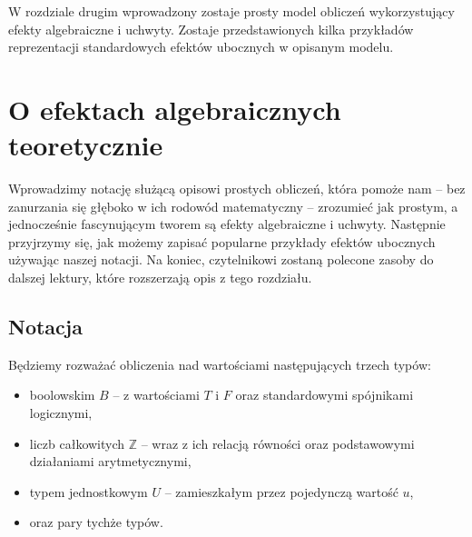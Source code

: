 \documentclass[shortabstract]{iithesis}
\begin{document}
W rozdziale drugim wprowadzony zostaje prosty model obliczeń wykorzystujący efekty algebraiczne i uchwyty. Zostaje przedstawionych kilka przykładów reprezentacji standardowych efektów ubocznych w opisanym modelu.



\chapter{O efektach algebraicznych teoretycznie}

Wprowadzimy notację służącą opisowi prostych obliczeń, która pomoże nam -- bez zanurzania się głęboko w ich rodowód matematyczny -- zrozumieć jak prostym, a jednocześnie fascynującym tworem są efekty algebraiczne i uchwyty. Następnie przyjrzymy się, jak możemy zapisać popularne przykłady efektów ubocznych używając naszej notacji. Na koniec, czytelnikowi zostaną polecone zasoby do dalszej lektury, które rozszerzają opis z tego rozdziału.

\section{Notacja}

\newcommand{\return}[1]{\mathbf{return}\ #1}
\newcommand{\op}[3]{#1(#2, #3)}
\newcommand{\opi}[3]{\op{op_{#1}}{#2}{#3}}
\newcommand{\handle}[2]{\mathbf{handle}\ #1\ \mathbf{with}\ #2}
\newcommand{\hcase}[3]{#1\ #2\ \Rightarrow\ #3}
\newcommand{\fun}[2]{\lambda #1.\ #2}
\newcommand{\eval}[1]{\llbracket\, #1\, \rrbracket}
\newcommand{\cond}[3]{\mathbf{if}\ #1\ \mathbf{then}\ #2\ \mathbf{else}\ #3}

Będziemy rozważać obliczenia nad wartościami następujących trzech typów:
\begin{itemize}
\item boolowskim \(B\) -- z wartościami \(T\) i \(F\) oraz standardowymi spójnikami logicznymi,
\item liczb całkowitych \(\mathbb{Z}\) -- wraz z ich relacją równości oraz podstawowymi działaniami arytmetycznymi,
\item typem jednostkowym \(U\) -- zamieszkałym przez pojedynczą wartość \(u\),
\item oraz pary tychże typów.
\end{itemize}

% 
% 
\end{document}
